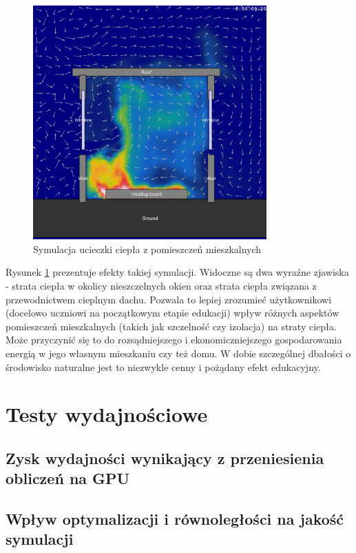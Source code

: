 \begin{figure}[!h]
\centering
\includegraphics[width=0.8\textwidth]{img/physics/wind}
\caption{Symulacja ucieczki ciepła z pomieszczeń mieszkalnych}
\label{fig:wind}
\end{figure}

Rysunek \ref{fig:wind} prezentuje efekty takiej symulacji. Widoczne są dwa
wyraźne zjawiska - strata ciepła w okolicy nieszczelnych okien oraz strata
ciepła związana z przewodnictwem cieplnym dachu. Pozwala to lepiej zrozumieć
użytkownikowi (docelowo uczniowi na początkowym etapie edukacji) wpływ różnych
aspektów pomieszczeń mieszkalnych (takich jak szczelność czy izolacja) na straty
ciepła. Może przyczynić się to do rozsądniejszego i ekonomiczniejszego
gospodarowania energią w jego własnym mieszkaniu czy też domu. W dobie
szczególnej dbałości o środowisko naturalne jest to niezwykle cenny i pożądany
efekt edukacyjny.

\section{Testy wydajnościowe}

\subsection{Zysk wydajności wynikający z przeniesienia obliczeń na GPU}

\subsection{Wpływ optymalizacji i równoległości na jakość symulacji}

